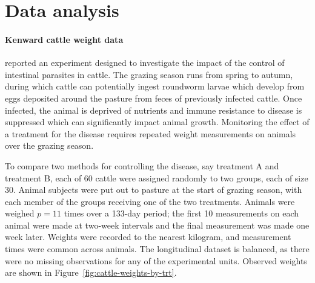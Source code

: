 
\chapter{Data analysis} \label{data-analysis-chapter}
\subsubsection{Kenward cattle weight data}

\cite{kenward1987method} reported an experiment designed to investigate the impact of the control of intestinal parasites in cattle. The grazing season runs from spring to autumn, during which cattle can potentially ingest roundworm larvae which develop from eggs deposited around the pasture from feces of previously infected cattle. Once infected, the animal is deprived of nutrients and immune resistance to disease is suppressed which can significantly impact animal growth. Monitoring the effect of a treatment for the disease requires repeated weight measurements on animals over the grazing season. 

\bigskip

To compare two methods for controlling the disease, say treatment A and treatment B, each of 60 cattle were assigned randomly to two groups, each of size 30. Animal subjects were put out to pasture at the start of grazing season, with each member of the groups receiving one of the two treatments. Animals were weighed $p = 11$ times over a 133-day period; the first 10 measurements on each animal were made at two-week intervals and the final measurement was made one week later. Weights were recorded to the nearest kilogram, and measurement times were common across animals. The longitudinal dataset is balanced, as there were no missing observations for any of the experimental units. Observed weights are shown in Figure~\ref{fig:cattle-weights-by-trt}.

